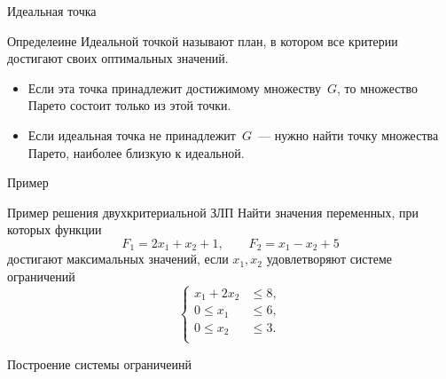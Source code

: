 \documentclass[unicode,11pt,notheorems,xcolor=table]{beamer}
\begin{document}
\begin{frame}{Идеальная точка}

    \begin{block}{Определеине}
        Идеальной точкой называют план, в котором все  критерии достигают своих оптимальных значений.
    \end{block}

    \bigskip
    \begin{itemize}
        \item Если эта точка принадлежит достижимому множеству $G$, то множество Парето состоит только из этой точки.
        \item Если идеальная точка не принадлежит~$G$~--- нужно найти точку множества Парето, наиболее близкую к идеальной.
    \end{itemize}
\end{frame}

\begin{frame}{Пример}
    \begin{exampleblock}{Пример решения двухкритериальной ЗЛП}
        Найти значения переменных, при которых функции
        $$
        F_1 = 2x_1 + x_2 + 1,\qquad F_2 = x_1 - x_2 + 5
        $$
         достигают максимальных значений, если $x_1,x_2$ удовлетворяют системе ограничений
        $$
        \left\lbrace
        \begin{aligned}
            x_1+2x_2 &\leqslant 8,\\
            0 \leqslant x_1 &\leqslant 6,\\
            0 \leqslant x_2 &\leqslant 3.\\
        \end{aligned}
        \right.
        $$
    \end{exampleblock}
\end{frame}

\begin{frame}{Построение системы ограничеинй}
    
\end{frame}
\end{document}

